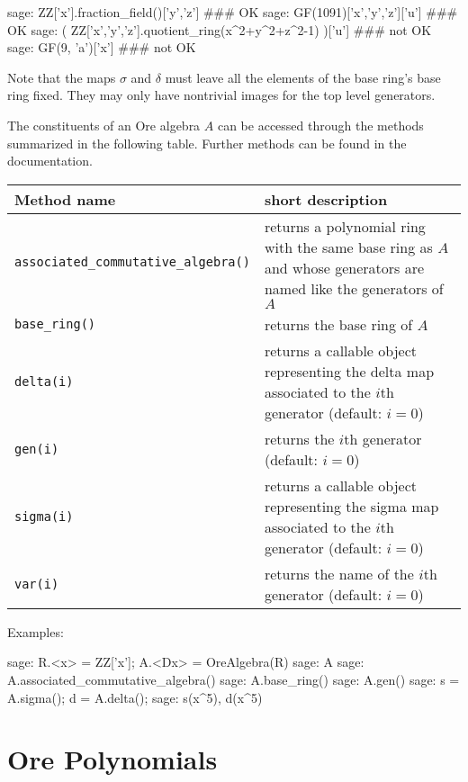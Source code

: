 \documentclass[11pt]{amsart}
\begin{document}
\begin{sageexample}
  sage: ZZ['x'].fraction_field()['y','z'] ### OK
  sage: GF(1091)['x','y','z']['u'] ### OK
  sage: ( ZZ['x','y','z'].quotient_ring(x^2+y^2+z^2-1) )['u'] ### not OK
  sage: GF(9, 'a')['x'] ### not OK
\end{sageexample}

Note that the maps $\sigma$ and $\delta$ must leave all the elements of
the base ring's base ring fixed. They may only have nontrivial images for
the top level generators. 

The constituents of an Ore algebra $A$ can be accessed through the methods
summarized in the following table. Further methods can be found in the 
documentation. 

\begin{center}
  \begin{tabular}{|l|p{.5\hsize}|}
    \hline
    Method name & short description \\\hline
    \verb|associated_commutative_algebra()| & returns a polynomial ring with the
       same base ring as $A$ and whose generators are named like the generators
       of~$A$\\
    \verb|base_ring()| & returns the base ring of $A$\\
    \verb|delta(i)| & returns a callable object representing the delta map
       associated to the $i$th generator (default: $i=0$) \\
    \verb|gen(i)| & returns the $i$th generator (default: $i=0$)\\
    \verb|sigma(i)| & returns a callable object representing the sigma map
       associated to the $i$th generator (default: $i=0$) \\
    \verb|var(i)| & returns the name of the $i$th generator (default: $i=0$)\\\hline
  \end{tabular}
\end{center}

\smallskip\goodbreak

Examples: 

\begin{sageexample}
  sage: R.<x> = ZZ['x']; A.<Dx> = OreAlgebra(R)
  sage: A
  sage: A.associated_commutative_algebra()
  sage: A.base_ring()
  sage: A.gen()
  sage: s = A.sigma(); d = A.delta(); 
  sage: s(x^5), d(x^5)
\end{sageexample}

\section{Ore Polynomials}\label{sec:3}
\end{document}
